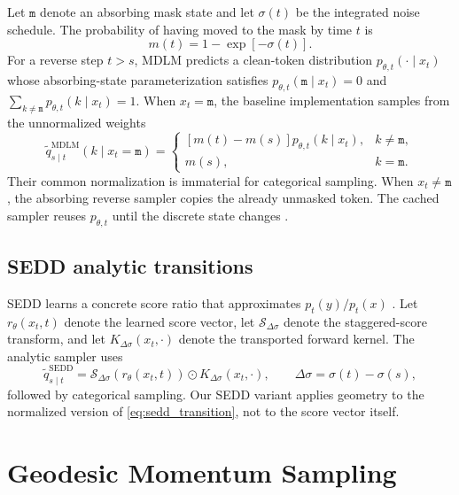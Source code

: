 \documentclass[10pt]{article}
\newcommand{\mask}{\mathtt{m}}
\begin{document}
Let $\mask$ denote an absorbing mask state and let $\sigma(t)$ be the integrated noise schedule.  The
probability of having moved to the mask by time $t$ is
\begin{equation}
  m(t)=1-\exp[-\sigma(t)].
\end{equation}
For a reverse step $t>s$, MDLM predicts a clean-token distribution
$p_{\theta,t}(\cdot\mid x_t)$ whose absorbing-state parameterization satisfies
$p_{\theta,t}(\mask\mid x_t)=0$ and $\sum_{k\ne\mask}p_{\theta,t}(k\mid x_t)=1$.
When $x_t=\mask$, the baseline implementation samples from the
unnormalized weights
\begin{equation}
  \widetilde q^{\mathrm{MDLM}}_{s\mid t}(k\mid x_t=\mask)=
  \begin{cases}
    [m(t)-m(s)]p_{\theta,t}(k\mid x_t), & k\neq\mask,\\
    m(s), & k=\mask.
  \end{cases}
  \label{eq:mdlm_transition}
\end{equation}
Their common normalization is immaterial for categorical sampling.  When $x_t\neq\mask$, the
absorbing reverse sampler copies the already unmasked token.  The cached sampler reuses
$p_{\theta,t}$ until the discrete state changes \citep{sahoo2024mdlm}.

\subsection{SEDD analytic transitions}

SEDD learns a concrete score ratio that approximates $p_t(y)/p_t(x)$
\citep{lou2024sedd}.  Let $r_\theta(x_t,t)$ denote the learned score vector, let
$\mathcal{S}_{\Delta\sigma}$ denote the staggered-score transform, and let
$K_{\Delta\sigma}(x_t,\cdot)$ denote the transported forward kernel.  The analytic sampler uses
\begin{equation}
  \widetilde q^{\mathrm{SEDD}}_{s\mid t}
  =\mathcal{S}_{\Delta\sigma}\!\left(r_\theta(x_t,t)\right)
   \odot K_{\Delta\sigma}(x_t,\cdot),
  \qquad
  \Delta\sigma=\sigma(t)-\sigma(s),
  \label{eq:sedd_transition}
\end{equation}
followed by categorical sampling.  Our SEDD variant applies geometry to the normalized version of
\cref{eq:sedd_transition}, not to the score vector itself.

\section{Geodesic Momentum Sampling}
\end{document}
